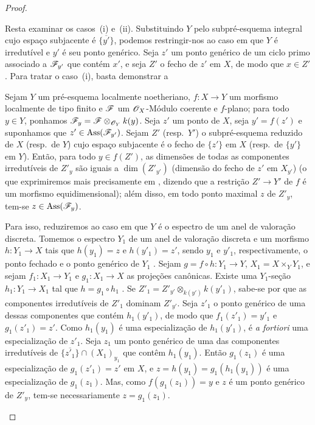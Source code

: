 \begin{proof}
\begin{env}[12.1.1.4]
\label{IV.12.1.1.4}
Resta examinar os casos~(i) e~(ii). Substituindo $Y$ pelo
subpré-esquema integral cujo espaço subjacente é
$\overline{\{y'\}}$, podemos restringir-nos ao caso em que $Y$
é irredutível e $y'$ é seu ponto genérico. Seja $z'$ um ponto
genérico de um ciclo primo associado a $\mathscr{F}_{y'}$
que contém $x'$, e seja $Z'$ o fecho de $z'$ em $X$, de modo
que $x\in Z'$. Para tratar o caso~(i), basta demonstrar a

\begin{proposition}[12.1.1.5]
\label{IV.12.1.1.5}
Sejam $Y$ um pré-esquema localmente noetheriano,
$f:X\to Y$ um morfismo localmente de tipo finito e
$\mathscr{F}$ um $\mathscr{O}_X$-Módulo coerente e $f$-plano;
para todo $y\in Y$, ponhamos
$\mathscr{F}_y=\mathscr{F}\otimes_{\mathscr{O}_Y}k(y)$.
Seja $z'$ um ponto de $X$, seja $y'=f(z')$ e
suponhamos que $z'\in\operatorname{Ass}(\mathscr{F}_{y'})$.
Sejam $Z'$ (resp.\ $Y'$) o subpré-esquema reduzido
de $X$ (resp.\ de $Y$) cujo espaço subjacente é o fecho
de $\{z'\}$ em $X$ (resp.\ de $\{y'\}$ em $Y$).
Então, para todo $y\in f(Z')$, as dimensões de todas
as componentes irredutíveis de $Z'_y$ são iguais a
$\dim(Z'_{y'})$ (dimensão do fecho de $z'$ em
$X_{y'}$) (o que exprimiremos mais precisamente em
, dizendo que a restrição
$Z'\to Y'$ de $f$ é um morfismo equidimensional);
além disso, em todo ponto maximal $z$ de $Z'_y$,
tem-se $z\in\operatorname{Ass}(\mathscr{F}_y)$.
\end{proposition}

Para isso, reduziremos ao caso em que $Y$ é o espectro
de um anel de valoração discreta. Tomemos o espectro
$Y_1$ de um anel de valoração discreta e um morfismo
$h:Y_1\to X$ tais que $h(y_1)=z$ e $h(y'_1)=z'$,
sendo $y_1$ e $y'_1$, respectivamente, o ponto fechado
e o ponto genérico de $Y_1$ .
Sejam $g=f\circ h:Y_1\to Y$,
$X_1=X\times_Y Y_1$, e sejam
$f_1:X_1\to Y_1$ e $g_1:X_1\to X$ as projeções
canônicas. Existe uma $Y_1$-seção $h_1:Y_1\to X_1$
tal que $h=g_1\circ h_1$ .
Se $Z'_1=Z'_{y'}\otimes_{k(y')}k(y'_1)$,
sabe-se por  que as componentes
irredutíveis de $Z'_1$ dominam $Z'_{y'}$.
Seja $z'_1$ o ponto genérico de uma dessas componentes
que contém $h_1(y'_1)$, de modo que
$f_1(z'_1)=y'_1$ e $g_1(z'_1)=z'$.
Como $h_1(y_1)$ é uma especialização de
$h_1(y'_1)$, é \emph{a fortiori} uma especialização
de $z'_1$. Seja $z_1$ um ponto genérico de uma das
componentes irredutíveis de
$\overline{\{z'_1\}}\cap(X_1)_{y_1}$ que contêm
$h_1(y_1)$. Então $g_1(z_1)$ é uma especialização
de $g_1(z'_1)=z'$ em $X$, e
$z=h(y_1)=g_1(h_1(y_1))$ é uma especialização de
$g_1(z_1)$. Mas, como $f(g_1(z_1))=y$ e $z$ é
um ponto genérico de $Z'_y$, tem-se necessariamente
$z=g_1(z_1)$.


\end{env}
\end{proof}
